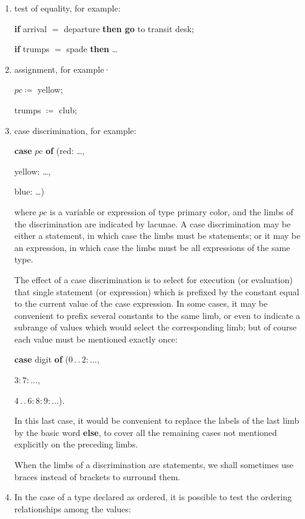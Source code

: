 \begin{enumerate}[leftmargin=2\parindent, label=(\arabic*)]
	\item test of equality, for example:

	\quad \textbf{if} arrival $=$ departure \textbf{then go} to transit desk;

	\quad \textbf{if} trumps $=$ spade \textbf{then} \dots

	\item assignment, for example·

	\quad $pc \coloneq$ yellow;

	\quad trumps $\coloneq$ club;

	\item \label{en:manipulation-3}
	case discrimination, for example:

	\quad \textbf{case} $p$c \textbf{of} (red: \dots,

	\tabto{5.7em}yellow: \dots,

	\tabto{5.7em}blue: \dots)
	
	where $pc$ is a variable or expression of type primary color, and the limbs of the discrimination are indicated by lacunae. A case discrimination may be either a statement, in which case the limbs must be statements; or it may be an expression, in which case the limbs must be all expressions of the same type.
	
	The effect of a case discrimination is to select for execution (or evaluation) that single statement (or expression) which is prefixed by the constant equal to the current value of the case expression. In some cases, it may be convenient to prefix several constants to the same limb, or even to indicate a subrange of values which would select the corresponding limb; but of course each value must be mentioned exactly once:
	
	\quad \textbf{case} digit \textbf{of} ($0\,.\,.\,2:\dots$,
	
	\tabto{6.6em}$3:7:\dots$,
	
	\tabto{6.6em}$4\,.\,.\,6:8:9:\dots$).
	
	\noindent
	In this last case, it would be convenient to replace the labels of the last limb by the basic word \textbf{else}, to cover all the remaining cases not mentioned explicitly on the preceding limbs.
	
	When the limbs of a discrimination are statements, we shall sometimes use braces instead of brackets to surround them.
	
	\item In the case of a type declared as ordered, it is possible to test the ordering relationships among the values:
	

\end{enumerate}
